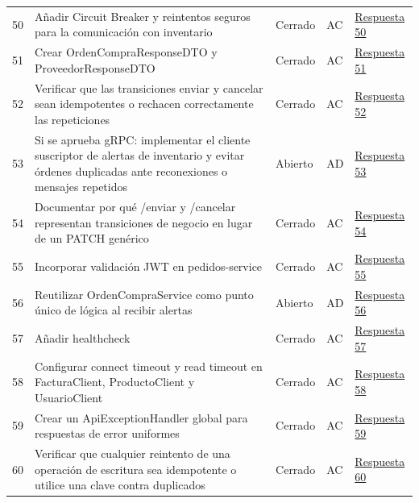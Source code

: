 \documentclass[12pt,a4paper]{article}
\begin{document}
{\begin{longtable}{p{0.6cm}p{6.8cm}p{1.7cm}p{1.1cm}p{2.8cm}}
50 & Añadir Circuit Breaker y reintentos seguros para la comunicación con inventario & Cerrado & AC & \href{https://github.com/JoseLozanoMorales/TiendaTech/issues/50#issuecomment-5499566316}{Respuesta 50} \\
51 & Crear OrdenCompraResponseDTO y ProveedorResponseDTO & Cerrado & AC & \href{https://github.com/JoseLozanoMorales/TiendaTech/issues/51#issuecomment-5499567221}{Respuesta 51} \\
52 & Verificar que las transiciones enviar y cancelar sean idempotentes o rechacen correctamente las repeticiones & Cerrado & AC & \href{https://github.com/JoseLozanoMorales/TiendaTech/issues/52#issuecomment-5499568157}{Respuesta 52} \\
53 & Si se aprueba gRPC: implementar el cliente suscriptor de alertas de inventario y evitar órdenes duplicadas ante reconexiones o mensajes repetidos & Abierto & AD & \href{https://github.com/JoseLozanoMorales/TiendaTech/issues/53#issuecomment-5499957575}{Respuesta 53} \\
54 & Documentar por qué /enviar y /cancelar representan transiciones de negocio en lugar de un PATCH genérico & Cerrado & AC & \href{https://github.com/JoseLozanoMorales/TiendaTech/issues/54#issuecomment-5499890678}{Respuesta 54} \\
55 & Incorporar validación JWT en pedidos-service & Cerrado & AC & \href{https://github.com/JoseLozanoMorales/TiendaTech/issues/55#issuecomment-5499893613}{Respuesta 55} \\
56 & Reutilizar OrdenCompraService como punto único de lógica al recibir alertas & Abierto & AD & \href{https://github.com/JoseLozanoMorales/TiendaTech/issues/56#issuecomment-5499959748}{Respuesta 56} \\
57 & Añadir healthcheck & Cerrado & AC & \href{https://github.com/JoseLozanoMorales/TiendaTech/issues/57#issuecomment-5499896900}{Respuesta 57} \\
58 & Configurar connect timeout y read timeout en FacturaClient, ProductoClient y UsuarioClient & Cerrado & AC & \href{https://github.com/JoseLozanoMorales/TiendaTech/issues/58#issuecomment-5499900322}{Respuesta 58} \\
59 & Crear un ApiExceptionHandler global para respuestas de error uniformes & Cerrado & AC & \href{https://github.com/JoseLozanoMorales/TiendaTech/issues/59#issuecomment-5499903875}{Respuesta 59} \\
60 & Verificar que cualquier reintento de una operación de escritura sea idempotente o utilice una clave contra duplicados & Cerrado & AC & \href{https://github.com/JoseLozanoMorales/TiendaTech/issues/60#issuecomment-5499907106}{Respuesta 60} \\

\end{longtable}}
\end{document}
